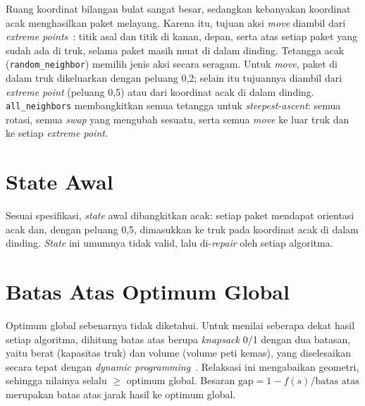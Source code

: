 Ruang koordinat bilangan bulat sangat besar, sedangkan kebanyakan koordinat acak
menghasilkan paket melayang. Karena itu, tujuan aksi \textit{move} diambil dari
\textit{extreme points}~\cite{crainic2008extreme}: titik asal dan titik di kanan,
depan, serta atas setiap paket yang sudah ada di truk, selama paket masih muat di
dalam dinding. Tetangga acak (\texttt{random\_neighbor}) memilih jenis aksi secara
seragam. Untuk \textit{move}, paket di dalam truk dikeluarkan dengan peluang 0,2;
selain itu tujuannya diambil dari \textit{extreme point} (peluang 0,5) atau dari
koordinat acak di dalam dinding. \texttt{all\_neighbors} membangkitkan semua tetangga
untuk \textit{steepest-ascent}: semua rotasi, semua \textit{swap} yang mengubah
sesuatu, serta semua \textit{move} ke luar truk dan ke setiap \textit{extreme point}.



\section{State Awal}

Sesuai spesifikasi, \textit{state} awal dibangkitkan acak: setiap paket mendapat
orientasi acak dan, dengan peluang 0,5, dimasukkan ke truk pada koordinat acak di
dalam dinding. \textit{State} ini umumnya tidak valid, lalu di-\textit{repair} oleh
setiap algoritma.



\section{Batas Atas Optimum Global}
\label{sec:bound}

Optimum global sebenarnya tidak diketahui. Untuk menilai seberapa dekat hasil setiap
algoritma, dihitung batas atas berupa \textit{knapsack} 0/1 dengan dua batasan, yaitu
berat (kapasitas truk) dan volume (volume peti kemas), yang diselesaikan secara tepat
dengan \textit{dynamic programming}~\cite{martello1990knapsack}. Relaksasi ini
mengabaikan geometri, sehingga nilainya selalu $\ge$ optimum global. Besaran
$\text{gap} = 1 - f(s)/\text{batas atas}$ merupakan batas atas jarak hasil ke optimum
global.




